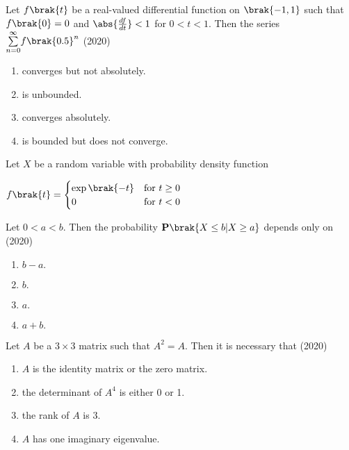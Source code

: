     \item Let $f\brak{t}$ be a real-valued differential function on $\brak{-1,1}$ such that $f\brak{0}=0$ and $\abs{\frac{df}{dt}}<1$ for $0<t<1$. Then the series $\underset{n=0}{\overset{\infty}{\sum}}f\brak{0.5}^n$
    \hfill{(2020)}


        \begin{enumerate}
            \item converges but not absolutely.
            \item is unbounded.
            \item converges absolutely.
            \item is bounded but does not converge.
        \end{enumerate}


    \item Let $X$ be a random variable with probability density function
    
    \begin{center}
    $f\brak{t}=
    \begin{cases}
        \exp\brak{-t} & \text{for } t\geq0\\
        0 & \text{for } t<0
    \end{cases}$
    \end{center}
    
    Let $0<a<b$. Then the probability $\mathbf{P}\brak{X\leq b|X\geq a}$ depends only on
    \hfill{(2020)}

    \begin{multicols}{4}
        \begin{enumerate}
            \item $b-a.$
            \item $b.$
            \item $a.$
            \item $a+b.$
        \end{enumerate}
    \end{multicols}


    \item Let $A$ be a $3\times3$ matrix such that $A^2=A$. Then it is necessary that 
    \hfill{(2020)}


        \begin{enumerate}
            \item $A$ is the identity matrix or the zero matrix.
            \item the determinant of $A^4$ is either 0 or 1.
            \item the rank of $A$ is 3.
            \item $A$ has one imaginary eigenvalue.
        \end{enumerate}


